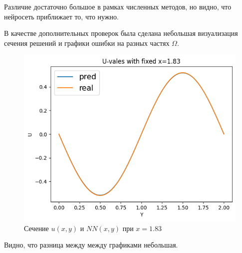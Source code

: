 Различие достаточно большое в рамках численных методов, но видно, что нейросеть приближает то, что нужно.

\newpage

В качестве дополнительных проверок была сделана небольшая визуализация сечения решений и графики ошибки на разных частях $\Omega$.

\begin{figure}[ht!]
    \centering
    \includegraphics[width=0.75\hsize]{images/5.png}
    \caption{Сечение $u(x, y)$ и $NN(x, y)$ при $x = 1.83$}
\end{figure}

Видно, что разница между между графиками небольшая.

